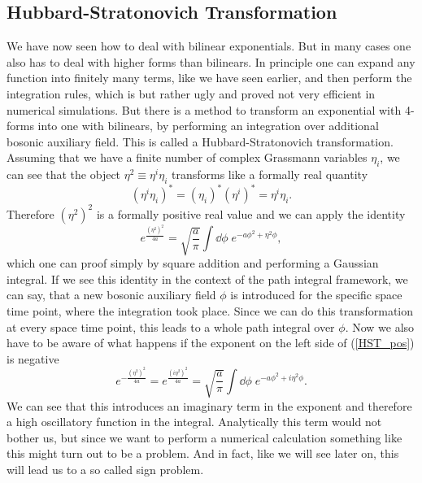\subsection{Hubbard-Stratonovich Transformation}
We have now seen how to deal with bilinear exponentials. But in many cases one also has to deal with higher forms than bilinears. In principle one can expand any function into finitely many terms, like we have seen earlier, and then perform the integration rules, which is but rather ugly and proved not very efficient in numerical simulations. But there is a method to transform an exponential with 4-forms into one with bilinears, by performing an integration over additional bosonic auxiliary field. This is called a Hubbard-Stratonovich transformation. Assuming that we have a finite number of complex Grassmann variables $\eta_{i}$, we can see that the object $\eta^{2}\equiv \eta^{i}\eta_{i}$ transforms like a formally real quantity
\begin{equation}
\left(\eta^{i}\eta_{i}\right)^{\ast}=\left(\eta_{i}\right)^{\ast}\left(\eta^{i}\right)^{\ast} =\eta^{i}\eta_{i}.
\end{equation}
Therefore $\left(\eta^{2}\right)^{2}$ is a formally positive real value and we can apply the identity
\begin{equation}
e ^{\frac{(\eta^{2})^{2}}{4a}}=\sqrt{\frac{a}{\pi}} \int\dd\phi\;e ^{-a\phi^{2}+\eta^{2}\phi},
\label{HST_pos}
\end{equation}
which one can proof simply by square addition and performing a Gaussian integral. If we see this identity in the context of the path integral  framework, we can say, that a new bosonic auxiliary field $\phi$ is introduced for the specific space time point, where the integration took place. Since we can do this transformation at every space time point, this leads to a whole path integral  over $\phi$. Now we also have to be aware of what happens if the exponent on the left side of (\ref{HST_pos}) is negative
\begin{equation}
e ^{-\frac{(\eta^{2})^{2}}{4a}}=e ^{\frac{(i\eta^{2})^{2}}{4a}}=\sqrt{\frac{a}{\pi}} \int\dd\phi\; e ^{-a\phi^{2}+i\eta^{2}\phi}.
\end{equation}
We can see that this introduces an imaginary term in the exponent and therefore a high oscillatory function in the integral. Analytically this term would not bother us, but since we want to perform a numerical calculation something like this might turn out to be a problem. And in fact, like we will see later on, this will lead us to a so called sign problem.
